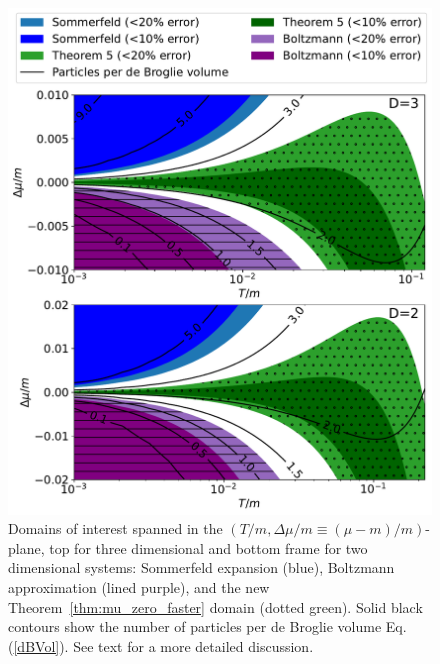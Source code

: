 \documentclass[sn-mathphys,Numbered]{sn-jnl}
\newcommand{\req}[1]{Eq.\,(\ref{#1})}
\newcommand{\rTh}[1]{Theorem~{\ref{#1}}}
\begin{document}
\begin{figure}[bht] %
\centering
 \includegraphics[width=.7\textwidth]{plot/Sommerfeld_vs_ours_vs_Boltzmann_regions_1_term.pdf}
\caption{Domains of interest spanned in the $(T/m,\Delta\mu/m\equiv(\mu-m)/m)$-plane, top for three dimensional and bottom frame for two dimensional systems: Sommerfeld expansion (blue), Boltzmann approximation (lined purple), and the new \rTh{thm:mu_zero_faster} domain (dotted green). Solid black contours show the number of particles per de Broglie volume \req{dBVol}. See text for a more detailed discussion.}\label{fig:Thm3_vs_Sommerfeld_regions}
\end{figure}
\end{document}

